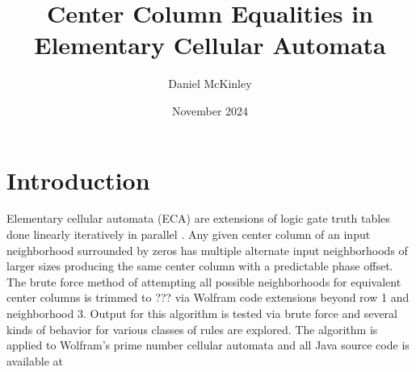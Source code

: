 \documentclass[11pt]{article}
\title{Center Column Equalities in Elementary Cellular Automata}
\date{November 2024}
\author{Daniel McKinley}
\begin{document}
    \maketitle


    \section{Introduction}
    Elementary cellular automata (ECA) are extensions of logic gate truth tables done linearly iteratively
    in parallel \cite{Wolfram}. Any given center column of an input neighborhood surrounded by
    zeros has multiple alternate input neighborhoods of larger sizes producing the same center
    column with a predictable phase offset. The brute force method of attempting all possible
    neighborhoods for equivalent center columns is trimmed to ??? via Wolfram code extensions
    beyond row 1 and neighborhood 3. Output for this algorithm is tested via brute force and several kinds of behavior
    for various classes of rules are explored. The algorithm is applied to Wolfram's prime number
    cellular automata \cite{Wolfram} and all Java source code is available at \cite{mygit}\\
\end{document}
